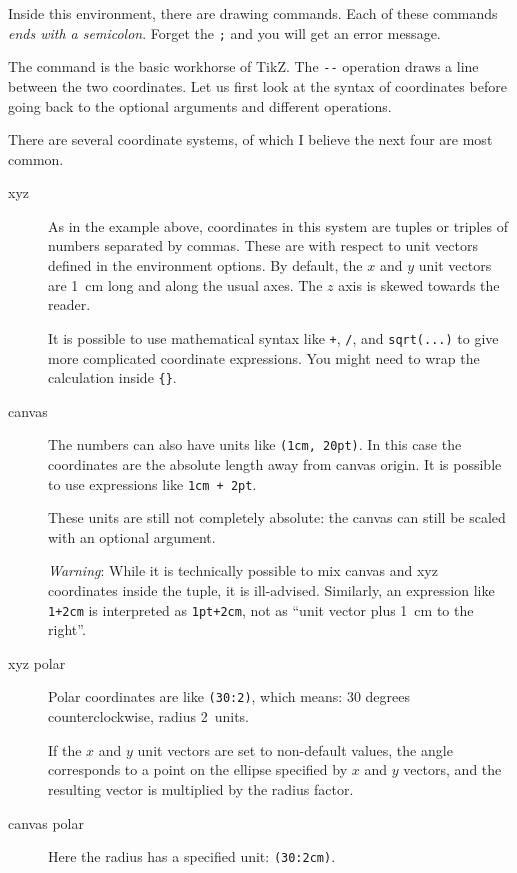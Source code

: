 Inside this environment, there are drawing commands.
Each of these commands \emph{ends with a semicolon}.
Forget the \verb|;| and you will get an error message.

The  command is the basic workhorse of TikZ.
The \verb|--| operation draws a line between the two coordinates.
Let us first look at the syntax of coordinates before going back to the optional arguments
and different operations.

There are several coordinate systems, of which I believe the next four are most common.
\begin{description}
\item[xyz] As in the example above, coordinates in this system are
    tuples or triples of numbers separated by commas.
    These are with respect to unit vectors defined in the environment options.
    By default, the $x$ and $y$ unit vectors are 1~cm long and along the usual axes.
    The $z$ axis is skewed towards the reader.

    It is possible to use mathematical syntax like \verb|+|, \verb|/|, and \verb|sqrt(...)|
    to give more complicated coordinate expressions.
    You might need to wrap the calculation inside \verb|{}|.

\item[canvas] The numbers can also have units like \verb|(1cm, 20pt)|.
    In this case the coordinates are the absolute length away from canvas origin.
    It is possible to use expressions like \verb|1cm + 2pt|.
    
    These units are still not completely absolute:
    the canvas can still be scaled with an optional argument.

    \emph{Warning}: While it is technically possible to mix canvas and xyz coordinates
    inside the tuple, it is ill-advised.
    Similarly, an expression like \verb|1+2cm| is interpreted as \verb|1pt+2cm|,
    not as ``unit vector plus 1~cm to the right''.

\item[xyz polar] Polar coordinates are like \verb|(30:2)|,
    which means: 30 degrees counterclockwise, radius 2~units.

    If the $x$ and $y$ unit vectors are set to non-default values,
    the angle corresponds to a point on the ellipse specified by $x$ and $y$ vectors,
    and the resulting vector is multiplied by the radius factor.

\item[canvas polar] Here the radius has a specified unit: \verb|(30:2cm)|.
\end{description}

